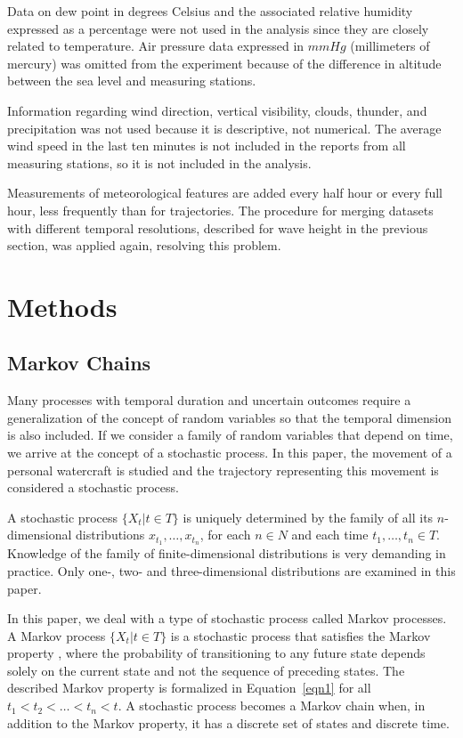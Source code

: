 \documentclass[preprint,12pt]{elsarticle}
\begin{document}
Data on dew point in degrees Celsius and the associated relative humidity expressed as a percentage were not used in the analysis since they are closely related to temperature. Air pressure data expressed in $mmHg$ (millimeters of mercury) was omitted from the experiment because of the difference in altitude between the sea level and measuring stations.

Information regarding wind direction, vertical visibility, clouds, thunder, and precipitation was not used because it is descriptive, not numerical. The average wind speed in the last ten minutes is not included in the reports from all measuring stations, so it is not included in the analysis.

Measurements of meteorological features are added every half hour or every full hour, less frequently than for trajectories. The procedure for merging datasets with different temporal resolutions, described for wave height in the previous section, was applied again, resolving this problem.

\section{Methods}
\label{sec:Methods}

\subsection{Markov Chains}

Many processes with temporal duration and uncertain outcomes require a generalization of the concept of random variables so that the temporal dimension is also included. If we consider a family of random variables that depend on time, we arrive at the concept of a stochastic process. In this paper, the movement of a personal watercraft is studied and the trajectory representing this movement is considered a stochastic process.

A stochastic process $\{X_{t}|t\in T\}$ is uniquely determined by the family of all its $n$-dimensional distributions $x_{t_{1}}, \dots, x_{t_{n}}$, for each $n \in N$ and each time $t_{1}, \dots, t_{n} \in T$. Knowledge of the family of finite-dimensional distributions is very demanding in practice. Only one-, two- and three-dimensional distributions are examined in this paper.

In this paper, we deal with a type of stochastic process called Markov processes. A Markov process $\{X_{t}|t\in T\}$ is a stochastic process that satisfies the Markov property \citep{Gagniuc}, where the probability of transitioning to any future state depends solely on the current state and not the sequence of preceding states. The described Markov property is formalized in Equation~\ref{eqn1} for all $t_{1} < t_{2} < \dots < t_{n} < t$. A stochastic process becomes a Markov chain when, in addition to the Markov property, it has a discrete set of states and discrete time.
\end{document}
